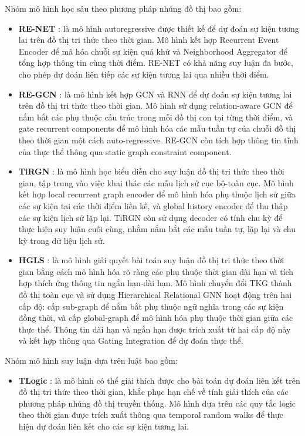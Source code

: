 Nhóm mô hình học sâu theo phương pháp nhúng đồ thị bao gồm:
\begin{itemize}
    \item \textbf{RE-NET} \cite{ref_article12}: là mô hình autoregressive được thiết kế để dự đoán sự kiện tương lai trên đồ thị tri thức theo thời gian. Mô hình kết hợp Recurrent Event Encoder để mã hóa chuỗi sự kiện quá khứ và Neighborhood Aggregator để tổng hợp thông tin cùng thời điểm. RE-NET có khả năng suy luận đa bước, cho phép dự đoán liên tiếp các sự kiện tương lai qua nhiều thời điểm.
    \item \textbf{RE-GCN} \cite{ref_article13}: là mô hình kết hợp GCN và RNN để dự đoán sự kiện tương lai trên đồ thị tri thức theo thời gian. Mô hình sử dụng relation-aware GCN để nắm bắt các phụ thuộc cấu trúc trong mỗi đồ thị con tại từng thời điểm, và gate recurrent components để mô hình hóa các mẫu tuần tự của chuỗi đồ thị theo thời gian một cách auto-regressive. RE-GCN còn tích hợp thông tin tĩnh của thực thể thông qua static graph constraint component.
    \item \textbf{TiRGN} \cite{ref_article22}:  là mô hình học biểu diễn cho suy luận đồ thị tri thức theo thời gian, tập trung vào việc khai thác các mẫu lịch sử cục bộ-toàn cục. Mô hình kết hợp local recurrent graph encoder để mô hình hóa phụ thuộc lịch sử giữa các sự kiện tại các thời điểm liền kề, và global history encoder để thu thập các sự kiện lịch sử lặp lại. TiRGN còn sử dụng decoder có tính chu kỳ để thực hiện suy luận cuối cùng, nhằm nắm bắt các mẫu tuần tự, lặp lại và chu kỳ trong dữ liệu lịch sử.
    \item \textbf{HGLS} \cite{ref_article14}: là mô hình giải quyết bài toán suy luận đồ thị tri thức theo thời gian bằng cách mô hình hóa rõ ràng các phụ thuộc thời gian dài hạn và tích hợp thích ứng thông tin ngắn hạn-dài hạn. Mô hình chuyển đổi TKG thành đồ thị toàn cục và sử dụng Hierarchical Relational GNN hoạt động trên hai cấp độ: cấp sub-graph để nắm bắt phụ thuộc ngữ nghĩa trong các sự kiện đồng thời, và cấp global-graph để mô hình hóa phụ thuộc thời gian giữa các thực thể. Thông tin dài hạn và ngắn hạn được trích xuất từ hai cấp độ này và kết hợp thông qua Gating Integration để dự đoán thực thể.
\end{itemize}

Nhóm mô hình suy luận dựa trên luật bao gồm:
\begin{itemize}
    \item \textbf{TLogic} \cite{ref_article23}: là mô hình có thể giải thích được cho bài toán dự đoán liên kết trên đồ thị tri thức theo thời gian, khắc phục hạn chế về tính giải thích của các phương pháp nhúng đồ thị truyền thống. Mô hình dựa trên các quy tắc logic theo thời gian được trích xuất thông qua temporal random walks để thực hiện dự đoán liên kết cho các sự kiện tương lai.
\end{itemize}

